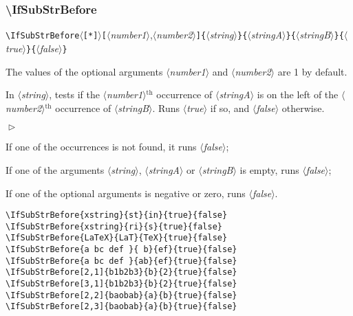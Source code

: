 \documentclass[a4paper,10pt]{article}
\newcommand\argu[1]{$\langle$\textit{#1}$\rangle$}
\newcommand\ARGU[1]{\texttt{\{}\argu{#1}\texttt{\}}}
\newcommand\arguCC[2]{\texttt{[}\argu{#1}{,}\argu{#2}\texttt{]}}
\newcommand\etoile{$\langle$\texttt{[*]}$\rangle$}
\newenvironment{Conditions}[1][1cm]%
{\begin{list}%
	{$\vartriangleright$}%
	{\setlength{\leftmargin}{#1}
	 \setlength{\itemsep}{0pt}
	 \setlength{\parsep}{0pt}
	 \setlength{\topsep}{2ptplus3ptminus2pt}
	}}%
{\end{list}}
\renewcommand\th{${}^\text{th}$\xspace}
\newcommand\styleexemple{\small\vskip4pt}
\newcommand\verbinline{\lstinline[basicstyle=\normalsize\ttfamily]}
\begin{document}
\subsubsection{\ttfamily\textbackslash IfSubStrBefore}
\verbinline|\IfSubStrBefore|\etoile\arguCC{number1}{number2}\ARGU{string}\ARGU{stringA}\ARGU{stringB}\ARGU{true}\ARGU{false}
\smallskip

The values of the optional arguments \argu{number1} and \argu{number2} are 1 by default.\par\smallskip

In \argu{string}, tests if the \argu{number1}\th occurrence of \argu{stringA} is on the left of the \argu{number2}\th occurrence of \argu{stringB}. Runs \argu{true} if so, and \argu{false} otherwise.\medskip

\begin{Conditions}
\item If one of the occurrences is not found, it runs \argu{false};
\item If one of the arguments \argu{string}, \argu{stringA} or \argu{stringB} is empty, runs \argu{false};
\item If one of the optional arguments is negative or zero, runs \argu{false}.
\end{Conditions}

\begin{minipage}[t]{0.65\linewidth}
\begin{lstlisting}
\IfSubStrBefore{xstring}{st}{in}{true}{false}
\IfSubStrBefore{xstring}{ri}{s}{true}{false}
\IfSubStrBefore{LaTeX}{LaT}{TeX}{true}{false}
\IfSubStrBefore{a bc def }{ b}{ef}{true}{false}
\IfSubStrBefore{a bc def }{ab}{ef}{true}{false}
\IfSubStrBefore[2,1]{b1b2b3}{b}{2}{true}{false}
\IfSubStrBefore[3,1]{b1b2b3}{b}{2}{true}{false}
\IfSubStrBefore[2,2]{baobab}{a}{b}{true}{false}
\IfSubStrBefore[2,3]{baobab}{a}{b}{true}{false}
\end{lstlisting}%
\end{minipage}\hfill
\begin{minipage}[t]{0.35\linewidth}
	\styleexemple
	\par
	\par
	\par
	\par
	\par
	\par
	\par
	\par
\end{minipage}%
\end{document}
